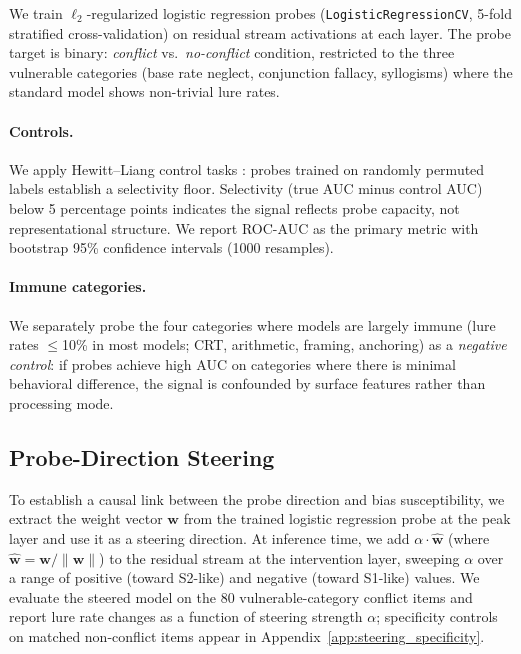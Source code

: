\documentclass{article}
\newcommand{\sone}{S1-like}
\newcommand{\stwo}{S2-like}
\begin{document}
We train $\ell_2$-regularized logistic regression probes
(\texttt{LogisticRegressionCV}, 5-fold stratified cross-validation) on
residual stream activations at each layer.  The probe target is binary:
\emph{conflict} vs.\ \emph{no-conflict} condition, restricted to the three
vulnerable categories (base rate neglect, conjunction fallacy, syllogisms)
where the standard model shows non-trivial lure rates.

\paragraph{Controls.}  We apply Hewitt--Liang control tasks
\citep{hewitt2019control}: probes trained on randomly permuted labels
establish a selectivity floor.  Selectivity (true AUC minus control AUC)
below 5 percentage points indicates the signal reflects probe capacity,
not representational structure.  We report ROC-AUC as the primary metric
with bootstrap 95\% confidence intervals (1000 resamples).

\paragraph{Immune categories.}  We separately probe the four categories
where models are largely immune (lure rates $\leq$10\% in most models;
CRT, arithmetic, framing, anchoring) as a \emph{negative control}: if
probes achieve high AUC on categories where there is minimal behavioral
difference, the signal is confounded by surface features rather than
processing mode.

\subsection{Probe-Direction Steering}
\label{sec:methods_steering}

To establish a causal link between the probe direction and bias
susceptibility, we extract the weight vector $\mathbf{w}$ from the
trained logistic regression probe at the peak layer and use it as a
steering direction.  At inference time, we add $\alpha \cdot \hat{\mathbf{w}}$
(where $\hat{\mathbf{w}} = \mathbf{w} / \|\mathbf{w}\|$) to the
residual stream at the intervention layer, sweeping $\alpha$ over a
range of positive (toward \stwo{}) and negative (toward \sone{}) values.
We evaluate the steered model on the 80 vulnerable-category conflict
items and report lure rate changes as a function of steering strength
$\alpha$; specificity controls on matched non-conflict items appear in
Appendix~\ref{app:steering_specificity}.
\end{document}
